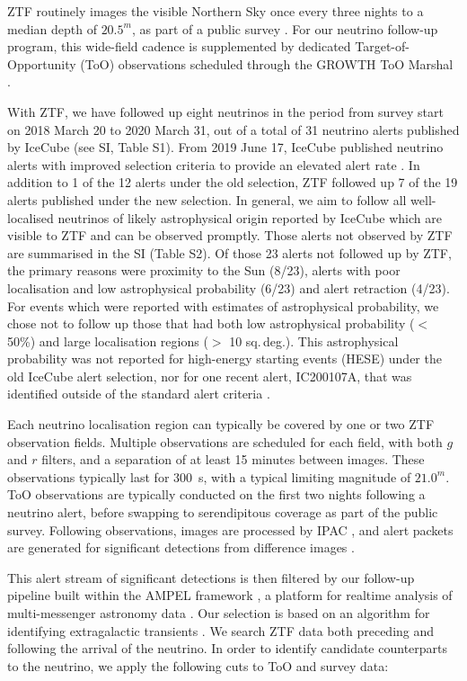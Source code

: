  ZTF routinely images the visible Northern Sky once every three nights to a median depth of $20.5^{m}$, as part of a public survey \cite{2019PASP..131a8002B, ztf_19_science}. For our neutrino follow-up program, this wide-field cadence is supplemented by dedicated Target-of-Opportunity (ToO) observations scheduled through the GROWTH ToO Marshal \cite{2019PASP..131d8001C}. 

With ZTF, we have followed up eight neutrinos in the period from survey start on 2018 March 20 to 2020 March 31, out of a total of 31 neutrino alerts published by IceCube (see SI, Table S1). From 2019 June 17, IceCube published neutrino alerts with improved selection criteria to provide an elevated alert rate . In addition to 1 of the 12 alerts under the old selection, ZTF  followed up 7 of the 19 alerts published under the new selection. In general, we aim to follow all well-localised neutrinos of likely astrophysical origin reported by IceCube which are visible to ZTF and can be observed promptly. Those alerts not observed by ZTF are summarised in the SI (Table S2). Of those 23 alerts not followed up by ZTF, the primary reasons were proximity to the Sun (8/23), alerts with poor localisation and low astrophysical probability (6/23) and alert retraction (4/23). For events which were reported with estimates of astrophysical probability, we chose not to follow up those that had both low astrophysical probability ($<$ 50\%) and large localisation regions ($>$ 10 sq.\,deg.). This astrophysical probability was not reported for high-energy starting events (HESE) under the old IceCube alert selection, nor for one recent alert, IC200107A, that was identified outside of the standard alert criteria \cite{stein:gcn26655}.

Each neutrino localisation region can typically be covered by one or two ZTF observation fields. Multiple observations are scheduled for each field, with both $g$ and $r$ filters, and a separation of at least 15 minutes between images. These observations typically last for 300~s, with a typical limiting magnitude of $21.0^{m}$.  ToO observations are typically conducted on the first two nights following a neutrino alert, before swapping to serendipitous coverage as part of the public survey. Following observations, images are processed by IPAC \cite{ztf_data_processing}, and alert packets are generated for significant detections from difference images \cite{zads_19}.

This alert stream of significant detections is then filtered by our follow-up pipeline built within the AMPEL framework \cite{ampel_followup_pipeline}, a platform for realtime analysis of multi-messenger astronomy data \cite{ampel}. Our selection is based on an algorithm for identifying extragalactic transients \cite{ampel}. We search ZTF data both preceding and following the arrival of the neutrino. In order to identify candidate counterparts to the neutrino, we apply the following cuts to ToO and survey data:

